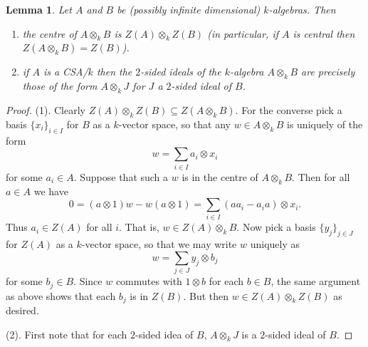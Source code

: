 \documentclass[11pt]{amsart}
\numberwithin{equation}{section}
\newtheorem{lemma}[equation]{Lemma}
\theoremstyle{remark}
\theoremstyle{remark}
\theoremstyle{remark}
\theoremstyle{definition}
\theoremstyle{definition}
\theoremstyle{definition}
\theoremstyle{definition}
\theoremstyle{definition}
\theoremstyle{definition}
\begin{document}
\begin{lemma} \label{CSA tensor product lemma}
Let $A$ and $B$ be (possibly infinite dimensional) $k$-algebras. Then

\begin{enumerate}
\item   the centre of $A\otimes_k B$ is $Z(A)\otimes_kZ(B)$ (in particular, if $A$ is central then $Z(A\otimes_kB)=Z(B)$).
\item  if $A$ is a CSA/$k$ then the $2$-sided ideals of the $k$-algebra $A\otimes_k B$ are precisely those of the form $A\otimes_k J$ for $J$ a $2$-sided ideal of $B$.
\end{enumerate}
\end{lemma}

\begin{proof}
(1). Clearly $Z(A)\otimes_kZ(B)\subseteq Z(A\otimes_k B)$. For the converse pick a basis $\{x_i\}_{i\in I}$ for $B$ as a $k$-vector space, so that any $w\in A\otimes_k B$ is uniquely of the form 
\[w=\sum_{i\in I}a_i\otimes x_i\]
for some $a_i\in A$. Suppose that such a $w$ is in the centre of $A\otimes_k B$. Then for all $a\in A$ we have
\[0=(a\otimes 1)w-w(a\otimes 1)=\sum_{i\in I}(aa_i-a_ia)\otimes x_i.\]
Thus $a_i\in Z(A)$ for all $i$. That is, $w\in Z(A)\otimes_kB$. Now pick a basis $\{y_j\}_{j\in J}$ for $Z(A)$ as a $k$-vector space, so that we may write $w$ uniquely as 
\[w=\sum_{j\in J}y_j\otimes b_j\] for some $b_j\in B$. Since $w$ commutes with $1\otimes b$ for each $b\in B$, the same argument as above shows that each $b_j$ is in $Z(B)$. But then $w\in Z(A)\otimes_k Z(B)$ as desired.

(2). First note that for each $2$-sided idea of $B$, $A\otimes_k J$ is a $2$-sided ideal of $B$. 


\end{proof}
\end{document}
